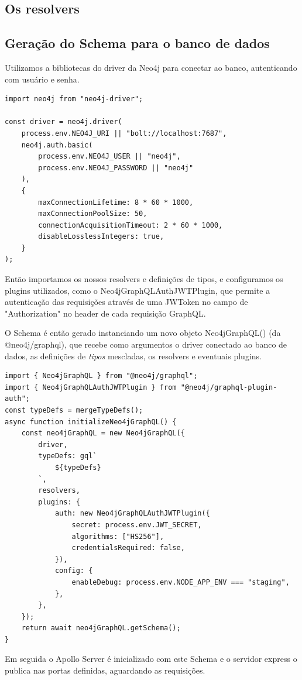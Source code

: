 \subsection{Os resolvers}

\subsection{Geração do Schema para o banco de dados}

 Utilizamos a bibliotecas do driver da Neo4j para conectar ao banco, autenticando com usuário e senha.
 
 \begin{lstlisting}
import neo4j from "neo4j-driver";

const driver = neo4j.driver(
	process.env.NEO4J_URI || "bolt://localhost:7687",
	neo4j.auth.basic(
		process.env.NEO4J_USER || "neo4j",
		process.env.NEO4J_PASSWORD || "neo4j"
	),
	{
		maxConnectionLifetime: 8 * 60 * 1000,
		maxConnectionPoolSize: 50,
		connectionAcquisitionTimeout: 2 * 60 * 1000,
		disableLosslessIntegers: true,
	}
);
\end{lstlisting}

Então importamos os nossos resolvers e definições de tipos, e configuramos os plugins utilizados, como o Neo4jGraphQLAuthJWTPlugin, que permite a autenticação das requisições através de uma JWToken no campo de "Authorization" no header de cada requisição GraphQL.

 O Schema é então gerado instanciando um novo objeto Neo4jGraphQL() (da @neo4j/graphql), que recebe como argumentos o driver conectado ao banco de dados, as definições de \textit{tipos} mescladas, os resolvers e eventuais plugins.

\begin{lstlisting}
import { Neo4jGraphQL } from "@neo4j/graphql";
import { Neo4jGraphQLAuthJWTPlugin } from "@neo4j/graphql-plugin-auth";
const typeDefs = mergeTypeDefs();
async function initializeNeo4jGraphQL() {
	const neo4jGraphQL = new Neo4jGraphQL({
		driver,
		typeDefs: gql`
			${typeDefs}
		`,
		resolvers,
		plugins: {
			auth: new Neo4jGraphQLAuthJWTPlugin({
				secret: process.env.JWT_SECRET,
				algorithms: ["HS256"],
				credentialsRequired: false,
			}),
			config: {
				enableDebug: process.env.NODE_APP_ENV === "staging",
			},
		},
	});
	return await neo4jGraphQL.getSchema();
}
\end{lstlisting}

Em seguida o Apollo Server é inicializado com este Schema e o servidor express o publica nas portas definidas, aguardando as requisições.


